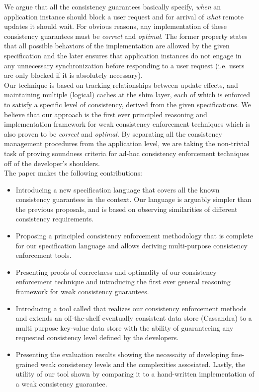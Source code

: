 We argue that all the consistency guarantees basically specify, \emph{when} an 
application instance should block a user request and for arrival of 
\emph{what} remote updates it should wait. For obvious reasons, any implementation of these 
consistency guarantees must be \emph{correct} and \emph{optimal}. The former property states that 
all possible behaviors of the implementation are allowed by the given specification and the later 
ensures that application instances do not engage in 
any unnecessary synchronization before responding to a user request (i.e. users are only blocked if 
it is absolutely necessary).
\\ Our technique is based on tracking relationships between update effects, and maintaining multiple 
(logical) caches at the shim layer, each of which is enforced to satisfy a specific level of consistency, 
derived from the given specifications. We believe that our approach is the first ever principled 
reasoning and implementation framework for weak consistency enforcement techniques which 
is also proven to be \emph{correct} and \emph{optimal}. 
By separating all the consistency management procedures from the application level, we are taking 
the non-trivial task of proving soundness criteria for ad-hoc consistency enforcement techniques 
off of the developer's shoulders. 
\\The paper makes the following contributions:
\begin{itemize}
\item Introducing a new specification language that covers all the known consistency guarantees in 
the context. Our language is arguably simpler than the previous proposals, and is based on observing 
similarities of different consistency requirements.

\item Proposing a principled consistency enforcement methodology that is 
complete for our specification language and allows deriving multi-purpose consistency enforcement 
tools.

\item Presenting proofs of correctness and optimality of our consistency enforcement technique
and introducing the first ever general reasoning framework for weak consistency guarantees. 

\item Introducing a tool called  \tool that realizes our consistency enforcement methods and 
extends an off-the-shelf eventually consistent data store (Cassandra) to a multi purpose key-value 
data store with the ability of guaranteeing any requested consistency level defined by the 
developers. 

\item Presenting the evaluation results showing the necessaity of
developing fine-grained weak consistency levels and the complexities
assosiated. Lastly, the utility of our tool shown by comparing it to a hand-written
implementation of a weak consistency guarantee. 
\end{itemize}

